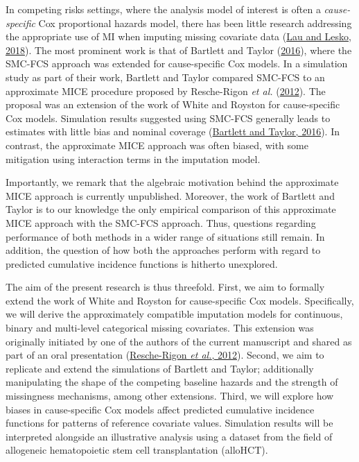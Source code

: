 \documentclass[
  letterpaper,
  DIV=11,
  numbers=noendperiod]{scrreprt}
\begin{document}
In competing risks settings, where the analysis model of interest is
often a \emph{cause-specific} Cox proportional hazards model, there has
been little research addressing the appropriate use of MI when imputing
missing covariate data
(\protect\hyperlink{ref-lauMissingnessSettingCompeting2018}{Lau and
Lesko, 2018}). The most prominent work is that of Bartlett and Taylor
(\protect\hyperlink{ref-bartlettMissingCovariatesCompeting2016}{2016}),
where the SMC-FCS approach was extended for cause-specific Cox models.
In a simulation study as part of their work, Bartlett and Taylor
compared SMC-FCS to an approximate MICE procedure proposed by
Resche-Rigon \emph{et al.}
(\protect\hyperlink{ref-resche-rigonImputingMissingCovariate2012}{2012}).
The proposal was an extension of the work of White and Royston for
cause-specific Cox models. Simulation results suggested using SMC-FCS
generally leads to estimates with little bias and nominal coverage
(\protect\hyperlink{ref-bartlettMissingCovariatesCompeting2016}{Bartlett
and Taylor, 2016}). In contrast, the approximate MICE approach was often
biased, with some mitigation using interaction terms in the imputation
model.

Importantly, we remark that the algebraic motivation behind the
approximate MICE approach is currently unpublished. Moreover, the work
of Bartlett and Taylor is to our knowledge the only empirical comparison
of this approximate MICE approach with the SMC-FCS approach. Thus,
questions regarding performance of both methods in a wider range of
situations still remain. In addition, the question of how both the
approaches perform with regard to predicted cumulative incidence
functions is hitherto unexplored.

The aim of the present research is thus threefold. First, we aim to
formally extend the work of White and Royston for cause-specific Cox
models. Specifically, we will derive the approximately compatible
imputation models for continuous, binary and multi-level categorical
missing covariates. This extension was originally initiated by one of
the authors of the current manuscript and shared as part of an oral
presentation
(\protect\hyperlink{ref-resche-rigonImputingMissingCovariate2012}{Resche-Rigon
\emph{et al.}, 2012}). Second, we aim to replicate and extend the
simulations of Bartlett and Taylor; additionally manipulating the shape
of the competing baseline hazards and the strength of missingness
mechanisms, among other extensions. Third, we will explore how biases in
cause-specific Cox models affect predicted cumulative incidence
functions for patterns of reference covariate values. Simulation results
will be interpreted alongside an illustrative analysis using a dataset
from the field of allogeneic hematopoietic stem cell transplantation
(alloHCT).
\end{document}
